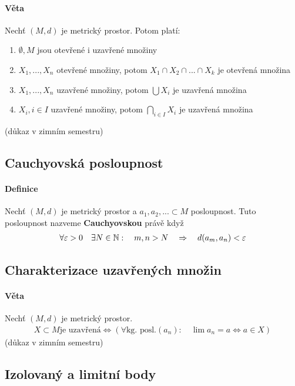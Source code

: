 \documentclass[a4paper,10pt]{article}
\begin{document}
\paragraph{Věta}
Nechť $(M, d)$ je metrický prostor. Potom platí:
\begin{enumerate}
	\item $\emptyset, M$ jsou otevřené i uzavřené množiny
	\item $X_1, ..., X_n$ otevřené množiny, potom $X_1 \cap X_2 \cap ... \cap X_k$ je
	otevřená množina
	\item $X_1, ..., X_n$ uzavřené množiny, potom $\bigcup X_i$ je uzavřená
	množina
	\item $X_i, i \in I$ uzavřené množiny, potom $\bigcap_{i\in I} X_i$ je
	uzavřená množina
\end{enumerate}
(důkaz v zimním semestru)

\subsection{Cauchyovská posloupnost}
\setcounter{equation}{0}
\paragraph{Definice}
Nechť $(M, d)$ je metrický prostor a $a_1, a_2, ... \subset M$ posloupnost.
Tuto posloupnost nazveme \textbf{Cauchyovskou} právě když
\begin{align*}
	\forall \varepsilon > 0 \quad \exists N \in \mathbb{N} : \quad m,n > N \quad
	\Rightarrow \quad d(a_m, a_n) < \varepsilon
\end{align*}

\subsection{Charakterizace uzavřených množin}
\setcounter{equation}{0}
\paragraph{Věta}
Nechť $(M, d)$ je metrický prostor. 
\begin{align*}
	X \subset M \text{je uzavřená} \Leftrightarrow \left(\forall \text{kg. posl.}
	(a_n): \quad \lim a_n = a \Leftrightarrow a \in X\right)
\end{align*}
(důkaz v zimním semestru)

\subsection{Izolovaný a limitní body}
\end{document}
